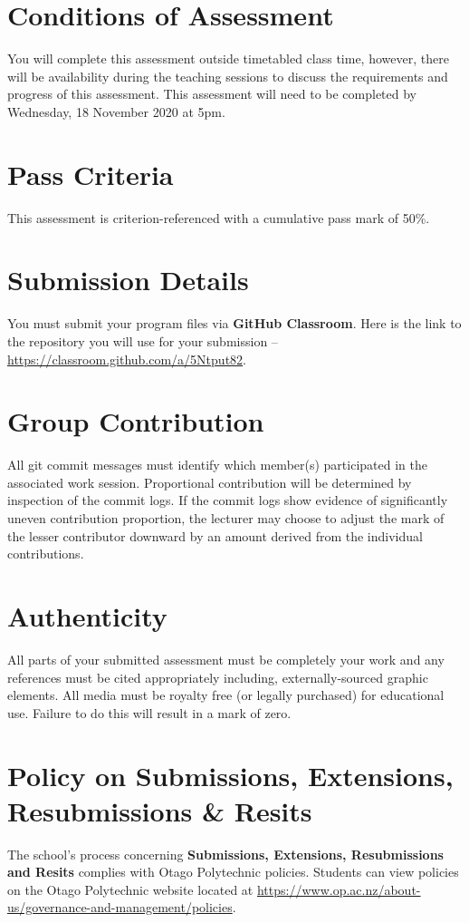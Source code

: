 \documentclass{article}
\begin{document}
\section*{Conditions of Assessment}
You will complete this assessment outside timetabled class time, however, there will be availability during the teaching sessions to discuss the requirements and progress of this assessment. This assessment will need to be completed by Wednesday, 18 November 2020 at 5pm. 

\section*{Pass Criteria}
This assessment is criterion-referenced with a cumulative pass mark of 50\%.

\section*{Submission Details}
You must submit your program files via \textbf{GitHub Classroom}. Here is the link to the repository you will use for your submission – \href{https://classroom.github.com/a/5Ntput82}{https://classroom.github.com/a/5Ntput82}.

\section*{Group Contribution}
All git commit messages must identify which member(s) participated in the associated work session. Proportional contribution will be determined by inspection of the commit logs. If the commit logs show evidence of significantly uneven contribution proportion, the lecturer may choose to adjust the mark of the lesser contributor downward by an amount derived from the individual contributions.

\section*{Authenticity}
All parts of your submitted assessment must be completely your work and any references must be cited appropriately including, externally-sourced graphic elements. All media must be royalty free (or legally purchased) for educational use. Failure to do this will result in a mark of zero.

\section*{Policy on Submissions, Extensions, Resubmissions \& Resits}
The school's process concerning \textbf{Submissions, Extensions, Resubmissions and Resits} complies with Otago Polytechnic policies. Students can view policies on the Otago Polytechnic website located at \href{https://www.op.ac.nz/about-us/governance-and-management/policies}{https://www.op.ac.nz/about-us/governance-and-management/policies}.
\end{document}
